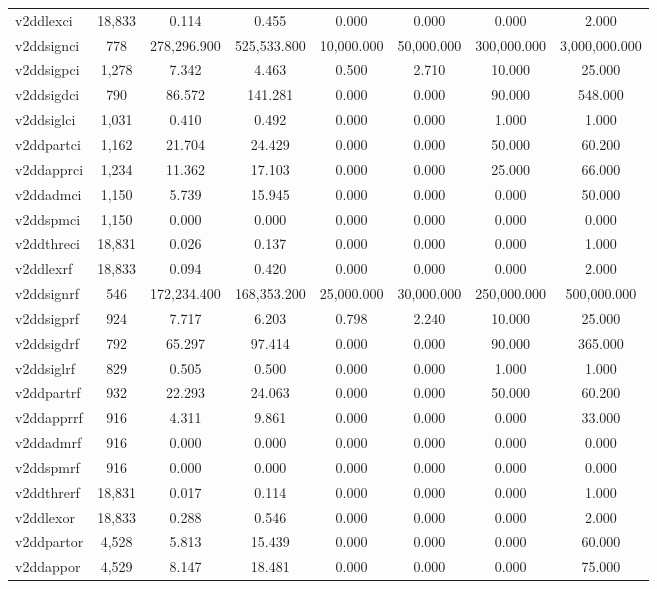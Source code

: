 \begin{table}[!htbp]
\begin{tabular}{@{\extracolsep{5pt}}lccccccc}
v2ddlexci & 18,833 & 0.114 & 0.455 & 0.000 & 0.000 & 0.000 & 2.000 \\ 
v2ddsignci & 778 & 278,296.900 & 525,533.800 & 10,000.000 & 50,000.000 & 300,000.000 & 3,000,000.000 \\ 
v2ddsigpci & 1,278 & 7.342 & 4.463 & 0.500 & 2.710 & 10.000 & 25.000 \\ 
v2ddsigdci & 790 & 86.572 & 141.281 & 0.000 & 0.000 & 90.000 & 548.000 \\ 
v2ddsiglci & 1,031 & 0.410 & 0.492 & 0.000 & 0.000 & 1.000 & 1.000 \\ 
v2ddpartci & 1,162 & 21.704 & 24.429 & 0.000 & 0.000 & 50.000 & 60.200 \\ 
v2ddapprci & 1,234 & 11.362 & 17.103 & 0.000 & 0.000 & 25.000 & 66.000 \\ 
v2ddadmci & 1,150 & 5.739 & 15.945 & 0.000 & 0.000 & 0.000 & 50.000 \\ 
v2ddspmci & 1,150 & 0.000 & 0.000 & 0.000 & 0.000 & 0.000 & 0.000 \\ 
v2ddthreci & 18,831 & 0.026 & 0.137 & 0.000 & 0.000 & 0.000 & 1.000 \\ 
v2ddlexrf & 18,833 & 0.094 & 0.420 & 0.000 & 0.000 & 0.000 & 2.000 \\ 
v2ddsignrf & 546 & 172,234.400 & 168,353.200 & 25,000.000 & 30,000.000 & 250,000.000 & 500,000.000 \\ 
v2ddsigprf & 924 & 7.717 & 6.203 & 0.798 & 2.240 & 10.000 & 25.000 \\ 
v2ddsigdrf & 792 & 65.297 & 97.414 & 0.000 & 0.000 & 90.000 & 365.000 \\ 
v2ddsiglrf & 829 & 0.505 & 0.500 & 0.000 & 0.000 & 1.000 & 1.000 \\ 
v2ddpartrf & 932 & 22.293 & 24.063 & 0.000 & 0.000 & 50.000 & 60.200 \\ 
v2ddapprrf & 916 & 4.311 & 9.861 & 0.000 & 0.000 & 0.000 & 33.000 \\ 
v2ddadmrf & 916 & 0.000 & 0.000 & 0.000 & 0.000 & 0.000 & 0.000 \\ 
v2ddspmrf & 916 & 0.000 & 0.000 & 0.000 & 0.000 & 0.000 & 0.000 \\ 
v2ddthrerf & 18,831 & 0.017 & 0.114 & 0.000 & 0.000 & 0.000 & 1.000 \\ 
v2ddlexor & 18,833 & 0.288 & 0.546 & 0.000 & 0.000 & 0.000 & 2.000 \\ 
v2ddpartor & 4,528 & 5.813 & 15.439 & 0.000 & 0.000 & 0.000 & 60.000 \\ 
v2ddappor & 4,529 & 8.147 & 18.481 & 0.000 & 0.000 & 0.000 & 75.000 \\ 

\end{tabular}
\end{table}
